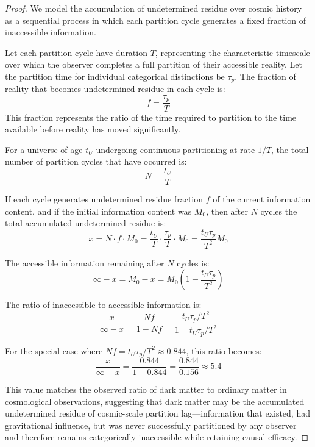 \documentclass[12pt,a4paper]{article}
\theoremstyle{definition}
\theoremstyle{remark}
\begin{document}
\begin{proof}
We model the accumulation of undetermined residue over cosmic history as a sequential process in which each partition cycle generates a fixed fraction of inaccessible information.

Let each partition cycle have duration $T$, representing the characteristic timescale over which the observer completes a full partition of their accessible reality. Let the partition time for individual categorical distinctions be $\tau_p$. The fraction of reality that becomes undetermined residue in each cycle is:
\begin{equation}
f = \frac{\tau_p}{T}
\end{equation}
This fraction represents the ratio of the time required to partition to the time available before reality has moved significantly.

For a universe of age $t_U$ undergoing continuous partitioning at rate $1/T$, the total number of partition cycles that have occurred is:
\begin{equation}
N = \frac{t_U}{T}
\end{equation}

If each cycle generates undetermined residue fraction $f$ of the current information content, and if the initial information content was $M_0$, then after $N$ cycles the total accumulated undetermined residue is:
\begin{equation}
x = N \cdot f \cdot M_0 = \frac{t_U}{T} \cdot \frac{\tau_p}{T} \cdot M_0 = \frac{t_U \tau_p}{T^2} M_0
\end{equation}

The accessible information remaining after $N$ cycles is:
\begin{equation}
\infty - x = M_0 - x = M_0 \left(1 - \frac{t_U \tau_p}{T^2}\right)
\end{equation}

The ratio of inaccessible to accessible information is:
\begin{equation}
    \frac{x}{\infty - x} = \frac{N f}{1 - N f} = \frac{t_U \tau_p / T^2}{1 - t_U \tau_p / T^2}
\end{equation}

For the special case where $Nf = t_U \tau_p / T^2 \approx 0.844$, this ratio becomes:
\begin{equation}
    \frac{x}{\infty - x} = \frac{0.844}{1 - 0.844} = \frac{0.844}{0.156} \approx 5.4
\end{equation}

This value matches the observed ratio of dark matter to ordinary matter in cosmological observations, suggesting that dark matter may be the accumulated undetermined residue of cosmic-scale partition lag—information that existed, had gravitational influence, but was never successfully partitioned by any observer and therefore remains categorically inaccessible while retaining causal efficacy.
\end{proof}
\end{document}
